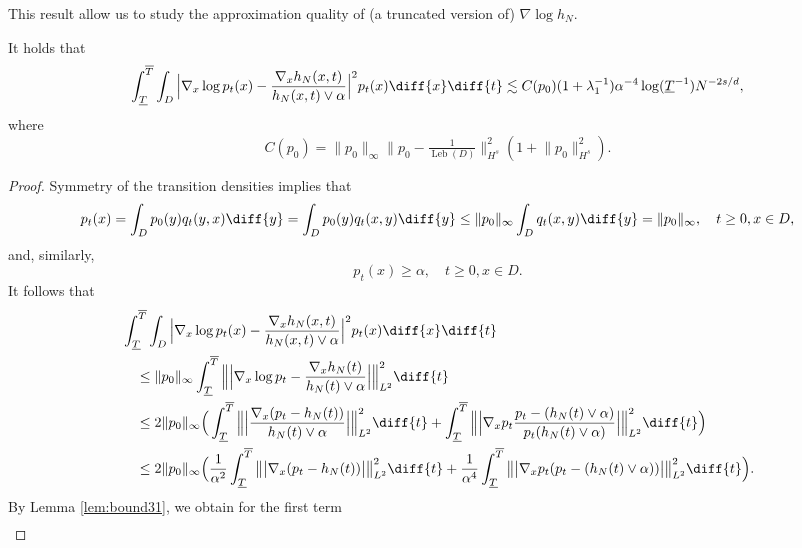\documentclass[a4paper, 11pt, headings = small, abstract]{scrartcl}
\begin{document}
This result allow us to study the approximation quality of (a truncated version of) $\nabla \log h_N$. 
\begin{proposition} \label{prop:approx_spectral0}
It holds that
\[\int_{\underline{T}}^{\overline{T}} \int_{D} \Big\lvert \nabla_x \log p_t(x) - \frac{\nabla_x h_N(x,t)}{h_N(x,t) \vee \alpha} \Big\rvert^2 p_t(x) \diff{x} \diff{t} \lesssim C(p_0)(1 + \lambda_1^{-1})\alpha^{-4} \log(\underline{T}^{-1}) N^{-2s/d},\]
where 
\[C(p_0) = \lVert p_0 \rVert_\infty\lVert p_0 - \tfrac{1}{\operatorname{Leb}(D)} \rVert^2_{H^s} (1+\lVert p_0 \rVert^2_{H^s}).\]
\end{proposition}
\begin{proof} 
Symmetry of the transition densities implies that
\[p_t(x) = \int_D p_0(y) q_t(y,x) \diff{y} = \int_D p_0(y) q_t(x,y) \diff{y} \leq \lVert p_0 \rVert_\infty \int_D q_t(x,y) \diff{y} = \lVert p_0 \rVert_\infty, \quad t \geq 0, x \in D,\]
and, similarly,
\[p_t(x) \geq \alpha, \quad t \geq 0, x \in D.\]
It follows that
\begin{equation}\label{eq:decomp2}
\begin{split}
&\int_{\underline{T}}^{\overline{T}} \int_{D} \Big\lvert \nabla_x \log p_t(x) - \frac{\nabla_x h_N(x,t)}{h_N(x,t)\vee \alpha} \Big\rvert^2 p_t(x) \diff{x} \diff{t}\\
&\quad\leq \lVert p_0 \rVert_\infty \int_{\underline{T}}^{\overline{T}} \Big\lVert \Big\lvert \nabla_x \log p_t - \frac{\nabla_x h_N(t)}{h_N(t) \vee \alpha} \Big\rvert \Big\rVert^2_{L^2}\diff{t}\\ 
&\quad\leq 2\lVert p_0 \rVert_\infty \Big(\int_{\underline{T}}^{\overline{T}} \Big\lVert \Big\lvert \frac{\nabla_x (p_t - h_N(t))}{h_N(t) \vee \alpha} \Big\rvert \Big\rVert^2_{L^2}\diff{t}+ \int_{\underline{T}}^{\overline{T}} \Big\lVert \Big\lvert \nabla_x p_t\frac{ p_t - (h_N(t) \vee \alpha)}{p_t(h_N(t) \vee \alpha)} \Big\rvert \Big\rVert^2_{L^2}\diff{t} \Big) \\ 
&\quad\leq 2\lVert p_0 \rVert_\infty \Big(\frac{1}{\alpha^2}\int_{\underline{T}}^{\overline{T}} \big\lVert \big\lvert \nabla_x (p_t - h_N(t)) \big\rvert \big\rVert^2_{L^2}\diff{t}+ \frac{1}{\alpha^4}\int_{\underline{T}}^{\overline{T}} \big\lVert \big\lvert \nabla_x p_t (p_t - (h_N(t) \vee \alpha)) \big\rvert \big\rVert^2_{L^2}\diff{t} \Big).
\end{split}
\end{equation}
By Lemma \ref{lem:bound31}, we obtain for the first term
\begin{equation}\label{eq:decomp21}
\begin{split}

\end{split}
\end{equation}
\end{proof}
\end{document}
